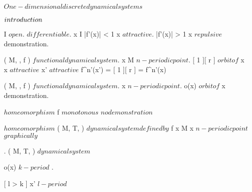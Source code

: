 \documentclass[../Main/main]{subfiles}
\begin{document}
\unit{ $ One-dimensional discrete dynamical systems $ }
{
	\introduction
	{ 
		$introduction\\$ 
	}

	{
		{
			I \subset \R $ open $.
			 $ differentiable $.
			x \in I
		}
		\holds
		{
			|f'(x)| < 1 \imp x $ attractive $.
			|f'(x)| > 1 \imp x $ repulsive $
		}
		\demonstration
		{
			demonstration.
		}
	}
	
	
	{
		{
			( M, \N, f ) $ functional dynamical system $.
			x \in M $ n-periodic point $.
			[ 1 ][ r ] $ orbit of $ x
		}
		\holds
		{
			x $ attractive $ \ifandonlyif {}
			{
				x' $ attractive $
			}
		}
		\demonstration
		{
			{
				f^{n'}(x') = [ 1 ][ r ] = f^{n'}(x)
			}
		}
	}


	{
		{
			( M, \N, f ) $ functional dynamical system $.
			x $ n-periodic point $.
			o(x) $ orbit of $ x
		}
		\holds
		{
			{
			}
		}
		\demonstration
		{
			demonstration.
		}
	}
	
	
	{
		{
			 $ homeomorphism $
		}
		\holds
		{
			f $ monotonous $
		}
		\demonstration
		{
			$ no demonstration $
		}
	}


	{
		{
			 $ homeomorphism $
			( M, T, \phi ) $ dynamical system defined by $ f
		}
		\holds
		{
			{
				\nexists \; x \in M \suchthat x $ n-periodic point $
			}
		}
		\demonstration
		{
			$graphically $
		}
	}


	{
		{
			.
			( M, T, \phi ) $ dynamical system $
		}
		\holds
		{
			{
				o(x) $ k-period $
			}.

			\imp {}
			{
				{
					x' $ l-period $
				}
			}
		}
	}
	
	
	

}
\end{document}
